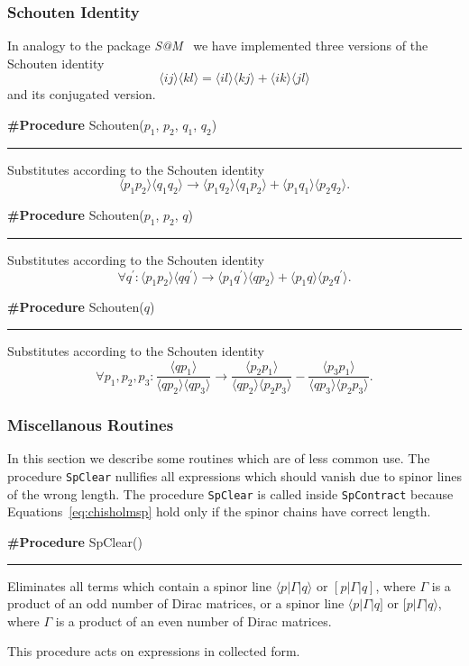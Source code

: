 \documentclass[preprint,number,12pt,sort&compress]{elsarticle}
\makeatletter
\newcommand{\SAM}{\textit{S@M}}
\newcommand{\Spaa}[1]{\langle #1 \rangle}
\newcommand{\Spab}[1]{\langle #1]}
\newcommand{\Spba}[1]{[ #1 \rangle}
\newcommand{\Spbb}[1]{[ #1 ]}
\newlength{\funcindent}
\newlength{\funcwidth}
\newenvironment{Procedure}[2]{%
\hspace{.8\funcindent}\begin{boxedminipage}{\funcwidth}
	\raggedright \textbf{\#Procedure} #1(#2)

	\vspace{-1.5ex}

	\rule{\textwidth}{0.5\fboxrule}
	\setlength{\parskip}{2ex}
}{\end{boxedminipage}}
\makeatother
\begin{document}
\subsubsection{Schouten Identity}
In analogy to the package \SAM~\cite{Maitre:2007jq}
we have implemented three versions of the Schouten identity
\begin{equation}
\Spaa{ij}\Spaa{kl}=\Spaa{il}\Spaa{kj}+\Spaa{ik}\Spaa{jl}
\end{equation}
and its conjugated version.

\begin{Procedure}{Schouten}{$p_1$, $p_2$, $q_1$, $q_2$}
Substitutes according to the Schouten identity
\begin{displaymath}
\Spaa{p_1p_2}\Spaa{q_1q_2}\rightarrow
\Spaa{p_1q_2}\Spaa{q_1p_2}+\Spaa{p_1q_1}\Spaa{p_2q_2}.
\end{displaymath}
\end{Procedure}

\medskip
\begin{Procedure}{Schouten}{$p_1$, $p_2$, $q$}
Substitutes according to the Schouten identity
\begin{displaymath}
\forall q^\prime: \Spaa{p_1p_2}\Spaa{qq^\prime}\rightarrow
\Spaa{p_1q^\prime}\Spaa{qp_2}+\Spaa{p_1q}\Spaa{p_2q^\prime}.
\end{displaymath}
\end{Procedure}

\medskip
\begin{Procedure}{Schouten}{$q$}
Substitutes according to the Schouten identity
\begin{displaymath}
\forall p_1,p_2,p_3: \frac{\Spaa{qp_1}}{\Spaa{qp_2}\Spaa{qp_3}}\rightarrow
\frac{\Spaa{p_2p_1}}{\Spaa{qp_2}\Spaa{p_2p_3}}
-\frac{\Spaa{p_3p_1}}{\Spaa{qp_3}\Spaa{p_2p_3}}.
\end{displaymath}
\end{Procedure}

\subsubsection{Miscellanous Routines}
In this section we describe some routines which are of less
common use. The procedure \texttt{SpClear} nullifies all expressions
which should vanish due to spinor lines of the wrong length.
The procedure \texttt{SpClear} is called inside \texttt{SpContract}
because Equations~\eqref{eq:chisholmsp} hold only if the spinor chains
have correct length.

\medskip
\begin{Procedure}{SpClear}{}
   Eliminates all terms which contain a spinor line
	$\Spaa{p\vert\Gamma\vert q}$ or $\Spbb{p\vert\Gamma\vert q}$,
	where $\Gamma$ is a product of an odd number of Dirac matrices,
	or a spinor line
	$\Spab{p\vert\Gamma\vert q}$ or $\Spba{p\vert\Gamma\vert q}$,
	where $\Gamma$ is a product of an even number of Dirac matrices.

	This procedure acts on expressions in collected form.
\end{Procedure}
\medskip
\end{document}
